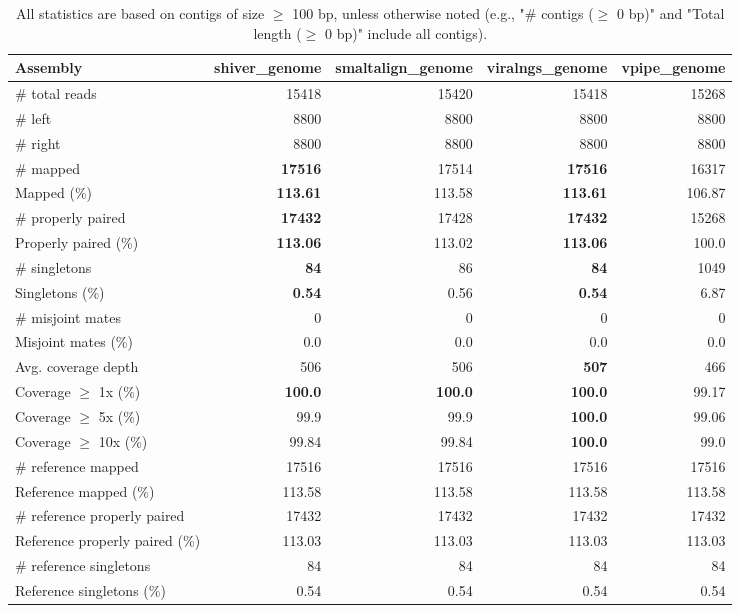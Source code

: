 \documentclass[12pt,a4paper]{article}
\begin{document}
\begin{table}[ht]
\begin{center}
\caption{All statistics are based on contigs of size $\geq$ 100 bp, unless otherwise noted (e.g., "\# contigs ($\geq$ 0 bp)" and "Total length ($\geq$ 0 bp)" include all contigs).}
\begin{tabular}{|l*{4}{|r}|}
\hline
Assembly & shiver\_genome & smaltalign\_genome & viralngs\_genome & vpipe\_genome \\ \hline
\# total reads & 15418 & 15420 & 15418 & 15268 \\ \hline
\# left & 8800 & 8800 & 8800 & 8800 \\ \hline
\# right & 8800 & 8800 & 8800 & 8800 \\ \hline
\# mapped & {\bf 17516} & 17514 & {\bf 17516} & 16317 \\ \hline
Mapped (\%) & {\bf 113.61} & 113.58 & {\bf 113.61} & 106.87 \\ \hline
\# properly paired & {\bf 17432} & 17428 & {\bf 17432} & 15268 \\ \hline
Properly paired (\%) & {\bf 113.06} & 113.02 & {\bf 113.06} & 100.0 \\ \hline
\# singletons & {\bf 84} & 86 & {\bf 84} & 1049 \\ \hline
Singletons (\%) & {\bf 0.54} & 0.56 & {\bf 0.54} & 6.87 \\ \hline
\# misjoint mates & 0 & 0 & 0 & 0 \\ \hline
Misjoint mates (\%) & 0.0 & 0.0 & 0.0 & 0.0 \\ \hline
Avg. coverage depth & 506 & 506 & {\bf 507} & 466 \\ \hline
Coverage $\geq$ 1x (\%) & {\bf 100.0} & {\bf 100.0} & {\bf 100.0} & 99.17 \\ \hline
Coverage $\geq$ 5x (\%) & 99.9 & 99.9 & {\bf 100.0} & 99.06 \\ \hline
Coverage $\geq$ 10x (\%) & 99.84 & 99.84 & {\bf 100.0} & 99.0 \\ \hline
\# reference mapped & 17516 & 17516 & 17516 & 17516 \\ \hline
Reference mapped (\%) & 113.58 & 113.58 & 113.58 & 113.58 \\ \hline
\# reference properly paired & 17432 & 17432 & 17432 & 17432 \\ \hline
Reference properly paired (\%) & 113.03 & 113.03 & 113.03 & 113.03 \\ \hline
\# reference singletons & 84 & 84 & 84 & 84 \\ \hline
Reference singletons (\%) & 0.54 & 0.54 & 0.54 & 0.54 \\ \hline

\end{tabular}
\end{center}
\end{table}
\end{document}
